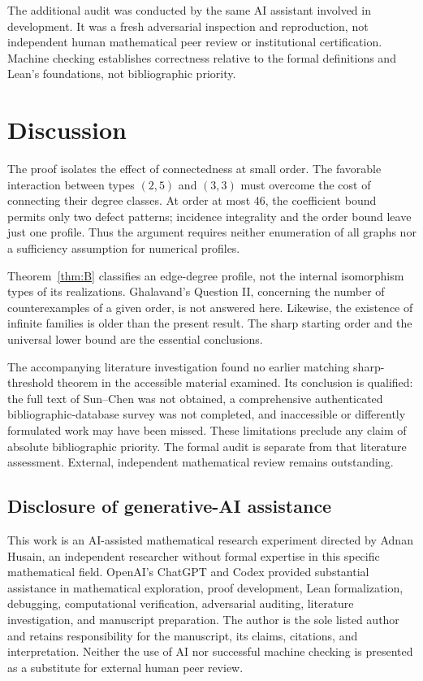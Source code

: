 \documentclass[11pt]{amsart}
\theoremstyle{definition}
\theoremstyle{remark}
\begin{document}
The additional audit was conducted by the same AI assistant involved in development. It was a fresh adversarial inspection and reproduction, not independent human mathematical peer review or institutional certification. Machine checking establishes correctness relative to the formal definitions and Lean's foundations, not bibliographic priority.

\section{Discussion}\label{sec:discussion}
The proof isolates the effect of connectedness at small order. The favorable interaction between types $(2,5)$ and $(3,3)$ must overcome the cost of connecting their degree classes. At order at most 46, the coefficient bound permits only two defect patterns; incidence integrality and the order bound leave just one profile. Thus the argument requires neither enumeration of all graphs nor a sufficiency assumption for numerical profiles.

Theorem~\ref{thm:B} classifies an edge-degree profile, not the internal isomorphism types of its realizations. Ghalavand's Question II, concerning the number of counterexamples of a given order, is not answered here. Likewise, the existence of infinite families is older than the present result. The sharp starting order and the universal lower bound are the essential conclusions.

The accompanying literature investigation found no earlier matching sharp-threshold theorem in the accessible material examined. Its conclusion is qualified: the full text of Sun--Chen \cite{SC} was not obtained, a comprehensive authenticated bibliographic-database survey was not completed, and inaccessible or differently formulated work may have been missed. These limitations preclude any claim of absolute bibliographic priority. The formal audit is separate from that literature assessment. External, independent mathematical review remains outstanding.

\subsection*{Disclosure of generative-AI assistance}
This work is an AI-assisted mathematical research experiment directed by Adnan Husain, an independent researcher without formal expertise in this specific mathematical field. OpenAI's ChatGPT and Codex provided substantial assistance in mathematical exploration, proof development, Lean formalization, debugging, computational verification, adversarial auditing, literature investigation, and manuscript preparation. The author is the sole listed author and retains responsibility for the manuscript, its claims, citations, and interpretation. Neither the use of AI nor successful machine checking is presented as a substitute for external human peer review.



\end{document}
